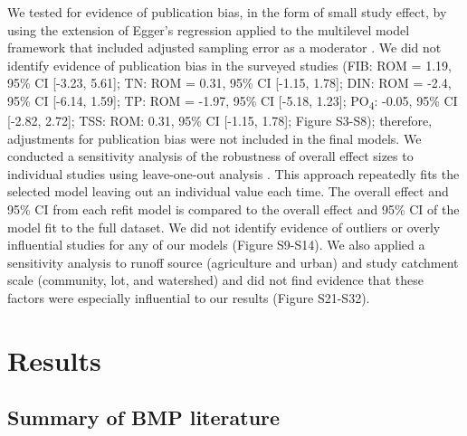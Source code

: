 \documentclass[utf8]{FrontiersinHarvard}
\begin{document}
We tested for evidence of publication bias, in the form of small study effect, by using the extension of Egger's regression applied to the multilevel model framework that included adjusted sampling error as a moderator \citep{nakagawaQuantitativeEvidenceSynthesis2023}.
We did not identify evidence of publication bias in the surveyed studies (FIB: ROM = 1.19, 95\% CI {[}-3.23, 5.61{]}; TN: ROM = 0.31, 95\% CI {[}-1.15, 1.78{]}; DIN: ROM = -2.4, 95\% CI {[}-6.14, 1.59{]}; TP: ROM = -1.97, 95\% CI {[}-5.18, 1.23{]}; PO\textsubscript{4}: -0.05, 95\% CI {[}-2.82, 2.72{]}; TSS: ROM: 0.31, 95\% CI {[}-1.15, 1.78{]}; Figure S3-S8); therefore, adjustments for publication bias were not included in the final models.
We conducted a sensitivity analysis of the robustness of overall effect sizes to individual studies using leave-one-out analysis \citep{nakagawaQuantitativeEvidenceSynthesis2023}.
This approach repeatedly fits the selected model leaving out an individual value each time.
The overall effect and 95\% CI from each refit model is compared to the overall effect and 95\% CI of the model fit to the full dataset.
We did not identify evidence of outliers or overly influential studies for any of our models (Figure S9-S14).
We also applied a sensitivity analysis to runoff source (agriculture and urban) and study catchment scale (community, lot, and watershed) and did not find evidence that these factors were especially influential to our results (Figure S21-S32).

\hypertarget{results}{%
\section{Results}\label{results}}

\hypertarget{summary-of-bmp-literature}{%
\subsection{Summary of BMP literature}\label{summary-of-bmp-literature}}
\end{document}
